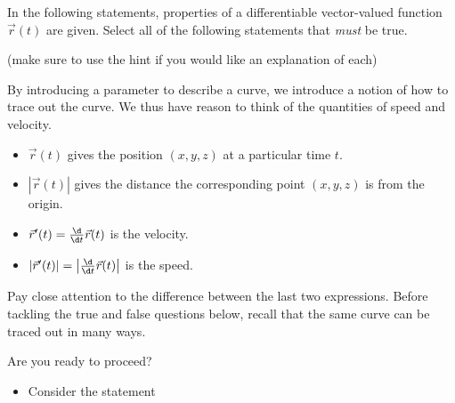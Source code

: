 \documentclass{ximera}
\author{Jim Talamo}
\begin{document}
\begin{exercise}

In the following statements, properties of a differentiable vector-valued function $\vec{r}(t)$ are given.  Select all of the following statements that \emph{must} be true.

\begin{selectAll}
\end{selectAll}

(make sure to use the hint if you would like an explanation of each)

\begin{hint}

By introducing a parameter to describe a curve, we introduce a notion of how to trace out the curve.  We thus have reason to think of the quantities of speed and velocity.

\begin{itemize}
\item $\vec{r}(t)$ gives the position $(x,y,z)$ at a particular time $t$.
\item $|\vec{r}(t)|$ gives the distance the corresponding point $(x,y,z)$ is from the origin.
\item $\vec{r}'(t) = \frac{\d}{\d t} \vec{r}(t)$ is the velocity.
\item  $\left|\vec{r}'(t)\right| = \left|  \frac{\d}{\d t}\vec{r}(t)\right|$ is the speed.
\end{itemize}
Pay close attention to the difference between the last two expressions.  Before tackling the true and false questions below, recall that the same curve can be traced out in many ways.  

\begin{question}
Are you ready to proceed?

\begin{multipleChoice}
\end{multipleChoice}

\begin{question}
\begin{itemize}
\item Consider the statement


\end{itemize}
\end{question}
\end{question}
\end{hint}
\end{exercise}
\end{document}

